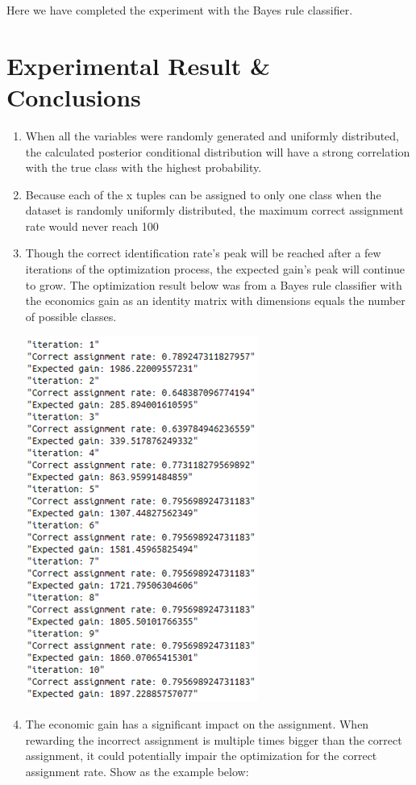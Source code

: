 \documentclass{article}
\begin{document}
\begin{multicols}{2}
Here we have completed the experiment with the Bayes rule classifier.
\section{Experimental Result \& Conclusions}
\begin{enumerate}
    \item When all the variables were randomly generated and uniformly distributed, the calculated posterior conditional distribution will have a strong correlation with the true class with the highest probability.
    \item Because each of the x tuples can be assigned to only one class when the dataset is randomly uniformly distributed, the maximum correct assignment rate would never reach 100%
    \item Though the correct identification rate's peak will be reached after a few iterations of the optimization process, the expected gain's peak will continue to grow. The optimization result below was from a Bayes rule classifier with the economics gain as an identity matrix with dimensions equals the number of possible classes.
    
    \includegraphics{fig12.png}

    \item The economic gain has a significant impact on the assignment. When rewarding the incorrect assignment is multiple times bigger than the correct assignment, it could potentially impair the optimization for the correct assignment rate. Show as the example below:  
    

\end{enumerate}
\end{multicols}
\end{document}
